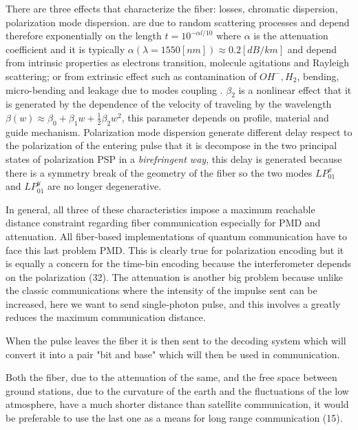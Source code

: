 There are three effects that characterize the fiber: losses, chromatic dispersion, polarization mode dispersion.  are due to random scattering processes and depend therefore exponentially on the length $t = 10^{-\alpha l / 10}$ where $\alpha$ is the attenuation coefficient and it is typically $\alpha(\lambda = 1550[nm]) \approx 0.2 [dB / km]$ and depend from intrinsic properties as electrons transition, molecule agitations and Rayleigh scattering; or from extrinsic effect such as contamination of $OH^-, H_2$, bending, micro-bending and leakage due to modes coupling .  $\beta_2$ is a nonlinear effect that it is generated by the dependence of the velocity of traveling by the wavelength $\beta(w) \approx \beta_0 + \beta_1 w + \frac{1}{2} \beta_2 w^2$, this parameter depends on profile, material and guide mechanism. Polarization mode dispersion  generate different delay respect to the polarization of the entering pulse that it is decompose in the two principal states of polarization PSP in a \textit{birefringent way}, this delay is generated because there is a symmetry break of the geometry of the fiber so the two modes $LP_{01}^x$ and $LP_{01}^y$ are no longer degenerative.

In general, all three of these characteristics impose a maximum reachable distance constraint regarding fiber communication especially for PMD and attenuation. All fiber-based implementations of quantum communication have to face this last problem PMD. This is clearly true for polarization encoding but it is equally a concern for the time-bin encoding because the interferometer depends on the polarization (32). The attenuation is another big problem because unlike the classic communications where the intensity of the impulse sent can be increased, here we want to send single-photon pulse, and this involves a greatly reduces the maximum communication distance.

When the pulse leaves the fiber it is then sent to the decoding system which will convert it into a pair "bit and base" which will then be used in communication.


Both the fiber, due to the attenuation of the same, and the free space between ground stations, due to the curvature of the earth and the fluctuations of the low atmosphere, have a much shorter distance than satellite communication, it would be preferable to use the last one as a means for long range communication (15).

